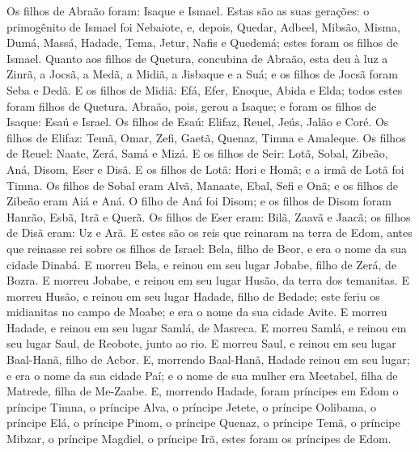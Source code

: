 Os filhos de Abraão foram: Isaque e Ismael. Estas são as
suas gerações: o primogênito de Ismael foi Nebaiote, e, depois,
Quedar, Adbeel, Mibsão, Misma, Dumá, Massá, Hadade, Tema,
Jetur, Nafis e Quedemá; estes foram os filhos de Ismael.
Quanto aos filhos de Quetura, concubina de Abraão, esta deu à
luz a Zinrã, a Jocsã, a Medã, a Midiã, a Jisbaque e a Suá; e os
filhos de Jocsã foram Seba e Dedã. E os filhos de Midiã: Efá,
Efer, Enoque, Abida e Elda; todos estes foram filhos de Quetura.
Abraão, pois, gerou a Isaque; e foram os filhos de Isaque:
Esaú e Israel. Os filhos de Esaú: Elifaz, Reuel, Jeús, Jalão
e Coré. Os filhos de Elifaz: Temã, Omar, Zefi, Gaetã, Quenaz,
Timna e Amaleque. Os filhos de Reuel: Naate, Zerá, Samá e
Mizá. E os filhos de Seir: Lotã, Sobal, Zibeão, Aná, Disom,
Eser e Disã. E os filhos de Lotã: Hori e Homã; e a irmã de
Lotã foi Timna. Os filhos de Sobal eram Alvã, Manaate, Ebal,
Sefi e Onã; e os filhos de Zibeão eram Aiá e Aná. O filho de
Aná foi Disom; e os filhos de Disom foram Hanrão, Esbã, Itrã e
Querã. Os filhos de Eser eram: Bilã, Zaavã e Jaacã; os filhos
de Disã eram: Uz e Arã. E estes são os reis que reinaram na
terra de Edom, antes que reinasse rei sobre os filhos de Israel:
Bela, filho de Beor, e era o nome da sua cidade Dinabá. E
morreu Bela, e reinou em seu lugar Jobabe, filho de Zerá, de Bozra.
E morreu Jobabe, e reinou em seu lugar Husão, da terra dos
temanitas. E morreu Husão, e reinou em seu lugar Hadade,
filho de Bedade; este feriu os midianitas no campo de Moabe; e era o
nome da sua cidade Avite. E morreu Hadade, e reinou em seu
lugar Samlá, de Masreca. E morreu Samlá, e reinou em seu
lugar Saul, de Reobote, junto ao rio. E morreu Saul, e reinou
em seu lugar Baal-Hanã, filho de Acbor. E, morrendo
Baal-Hanã, Hadade reinou em seu lugar; e era o nome da sua cidade
Paí; e o nome de sua mulher era Meetabel, filha de Matrede, filha de
Me-Zaabe. E, morrendo Hadade, foram príncipes em Edom o
príncipe Timna, o príncipe Alva, o príncipe Jetete, o
príncipe Oolibama, o príncipe Elá, o príncipe Pinom, o
príncipe Quenaz, o príncipe Temã, o príncipe Mibzar, o
príncipe Magdiel, o príncipe Irã, estes foram os príncipes de Edom.

\medskip

